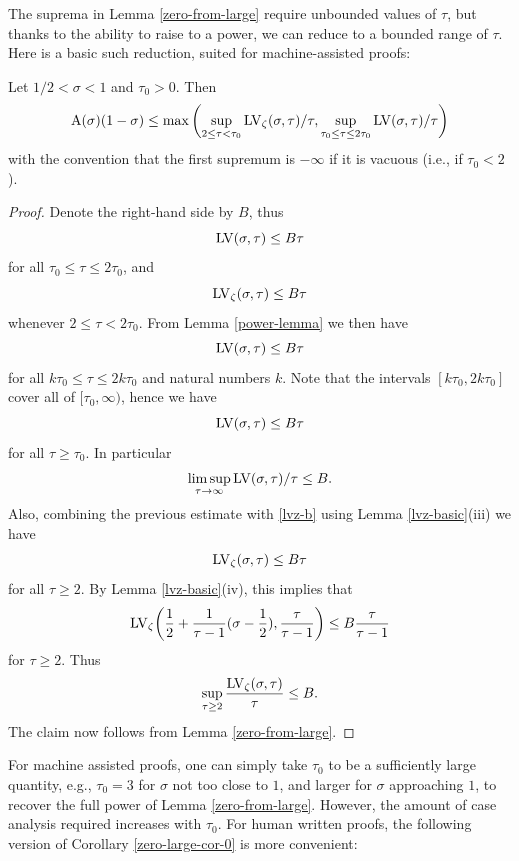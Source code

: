 The suprema in Lemma \ref{zero-from-large} require unbounded values of $\tau$, but thanks to the ability to raise to a power, we can reduce to a bounded range of $\tau$.  Here is a basic such reduction, suited for machine-assisted proofs:

\begin{corollary}\label{zero-large-cor-0} Let $1/2 < \sigma < 1$ and $\tau_0 > 0$.  Then
    $$ \mathrm{A}(\sigma)(1-\sigma) \leq \max \left(\sup_{2 \leq \tau < \tau_0} \mathrm{LV}_\zeta(\sigma,\tau)/\tau, \sup_{\tau_0 \leq \tau \leq 2\tau_0} \mathrm{LV}(\sigma,\tau)/\tau\right)$$
    with the convention that the first supremum is $-\infty$ if it is vacuous (i.e., if $\tau_0 < 2$).
\end{corollary}

\begin{proof}
Denote the right-hand side by $B$, thus
    $$ \mathrm{LV}(\sigma,\tau) \leq B\tau$$
    for all $\tau_0 \leq \tau \leq 2\tau_0$, and
    \begin{equation}\label{lvz-b}
         \mathrm{LV}_\zeta(\sigma,\tau) \leq B\tau
    \end{equation}
    whenever $2 \leq \tau < 2\tau_0$.  From Lemma \ref{power-lemma} we then have
    $$ \mathrm{LV}(\sigma,\tau) \leq B\tau$$
    for all $k\tau_0 \leq \tau \leq 2k\tau_0$ and natural numbers $k$. Note that the intervals $[k\tau_0, 2k\tau_0]$ cover all of $[\tau_0,\infty)$, hence we have
    $$ \mathrm{LV}(\sigma,\tau) \leq B\tau$$
    for all $\tau \geq \tau_0$. In particular
    $$ \limsup_{\tau \to \infty} \mathrm{LV}(\sigma,\tau)/\tau  \leq B.$$
    Also, combining the previous estimate with \eqref{lvz-b} using Lemma \ref{lvz-basic}(iii) we have
    \begin{equation}\label{lvzo}
     \mathrm{LV}_\zeta(\sigma,\tau) \leq B\tau
    \end{equation}
    for all $\tau \geq 2$.  By Lemma \ref{lvz-basic}(iv), this implies that
    $$ \mathrm{LV}_\zeta\bigg(\frac{1}{2} + \frac{1}{\tau-1} (\sigma-\frac{1}{2}), \frac{\tau}{\tau-1} \bigg) \leq B \frac{\tau}{\tau-1}$$
    for $\tau \geq 2$.  Thus
    $$ \sup_{\tau \geq 2} \frac{\mathrm{LV}_\zeta(\sigma,\tau)}{\tau} \leq B.$$
    The claim now follows from Lemma \ref{zero-from-large}.
\end{proof}

For machine assisted proofs, one can simply take $\tau_0$ to be a sufficiently large quantity, e.g., $\tau_0=3$ for $\sigma$ not too close to $1$, and larger for $\sigma$ approaching $1$, to recover the full power of Lemma \ref{zero-from-large}.  However, the amount of case analysis required increases with $\tau_0$.  For human written proofs, the following version of Corollary \ref{zero-large-cor-0} is more convenient:

